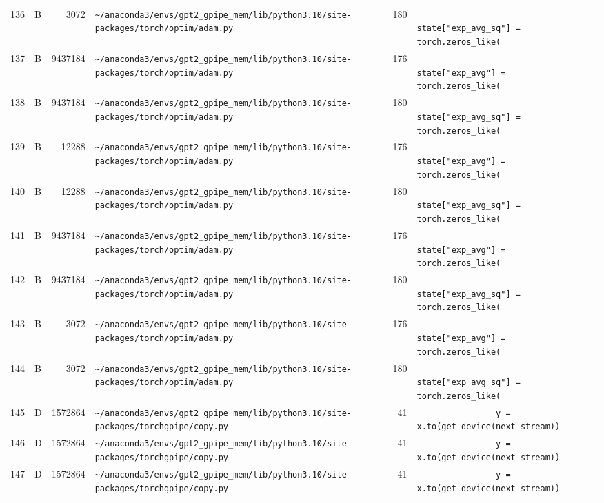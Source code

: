 \documentclass{article}
\begin{document}
\begin{longtable}{r l r p{6.5cm} r p{7.0cm}}
136 & B & 3072 & \lstinline|~/anaconda3/envs/gpt2_gpipe_mem/lib/python3.10/site-packages/torch/optim/adam.py| & 180 & \lstinline|                    state["exp_avg_sq"] = torch.zeros_like(| \\
137 & B & 9437184 & \lstinline|~/anaconda3/envs/gpt2_gpipe_mem/lib/python3.10/site-packages/torch/optim/adam.py| & 176 & \lstinline|                    state["exp_avg"] = torch.zeros_like(| \\
138 & B & 9437184 & \lstinline|~/anaconda3/envs/gpt2_gpipe_mem/lib/python3.10/site-packages/torch/optim/adam.py| & 180 & \lstinline|                    state["exp_avg_sq"] = torch.zeros_like(| \\
139 & B & 12288 & \lstinline|~/anaconda3/envs/gpt2_gpipe_mem/lib/python3.10/site-packages/torch/optim/adam.py| & 176 & \lstinline|                    state["exp_avg"] = torch.zeros_like(| \\
140 & B & 12288 & \lstinline|~/anaconda3/envs/gpt2_gpipe_mem/lib/python3.10/site-packages/torch/optim/adam.py| & 180 & \lstinline|                    state["exp_avg_sq"] = torch.zeros_like(| \\
141 & B & 9437184 & \lstinline|~/anaconda3/envs/gpt2_gpipe_mem/lib/python3.10/site-packages/torch/optim/adam.py| & 176 & \lstinline|                    state["exp_avg"] = torch.zeros_like(| \\
142 & B & 9437184 & \lstinline|~/anaconda3/envs/gpt2_gpipe_mem/lib/python3.10/site-packages/torch/optim/adam.py| & 180 & \lstinline|                    state["exp_avg_sq"] = torch.zeros_like(| \\
143 & B & 3072 & \lstinline|~/anaconda3/envs/gpt2_gpipe_mem/lib/python3.10/site-packages/torch/optim/adam.py| & 176 & \lstinline|                    state["exp_avg"] = torch.zeros_like(| \\
144 & B & 3072 & \lstinline|~/anaconda3/envs/gpt2_gpipe_mem/lib/python3.10/site-packages/torch/optim/adam.py| & 180 & \lstinline|                    state["exp_avg_sq"] = torch.zeros_like(| \\
145 & D & 1572864 & \lstinline|~/anaconda3/envs/gpt2_gpipe_mem/lib/python3.10/site-packages/torchgpipe/copy.py| & 41 & \lstinline|                y = x.to(get_device(next_stream))| \\
146 & D & 1572864 & \lstinline|~/anaconda3/envs/gpt2_gpipe_mem/lib/python3.10/site-packages/torchgpipe/copy.py| & 41 & \lstinline|                y = x.to(get_device(next_stream))| \\
147 & D & 1572864 & \lstinline|~/anaconda3/envs/gpt2_gpipe_mem/lib/python3.10/site-packages/torchgpipe/copy.py| & 41 & \lstinline|                y = x.to(get_device(next_stream))| \\

\end{longtable}
\end{document}
